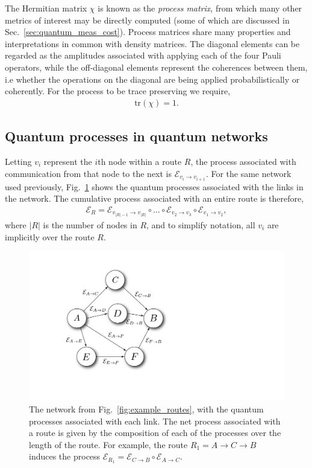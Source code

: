 \documentclass[aps,rmp,twocolumn,amsmath,amssymb,nofootinbib,superscriptaddress,longbibliography,floatfix]{revtex4-1}
\begin{document}
The Hermitian matrix $\chi$ is known as the \emph{process matrix}, from which many other metrics of interest may be directly computed (some of which are discussed in Sec.~\ref{sec:quantum_meas_cost}). Process matrices share many properties and interpretations in common with density matrices. The diagonal elements can be regarded as the amplitudes associated with applying each of the four Pauli operators, while the off-diagonal elements represent the coherences between them, i.e whether the operations on the diagonal are being applied probabilistically or coherently. For the process to be trace preserving we require,
\begin{align}
\mathrm{tr}(\chi) = 1.
\end{align}

%
%

\subsection{Quantum processes in quantum networks} \label{sec:quant_proc_in}

Letting $v_i$ represent the $i$th node within a route $R$, the process associated with communication from that node to the next is $\mathcal{E}_{v_i\to v_{i+1}}$. For the same network used previously, Fig.~\ref{fig:example_proc_graph} shows the quantum processes associated with the links in the network. The cumulative process associated with an entire route is therefore,
\begin{align}
\mathcal{E}_R = \mathcal{E}_{{v_{|R|-1}}\to v_{|R|}} \circ \dots \circ \mathcal{E}_{v_2\to v_3} \circ \mathcal{E}_{v_1\to v_2},
\end{align}
where $|R|$ is the number of nodes in $R$, and to simplify notation, all $v_i$ are implicitly over the route $R$.

\begin{figure}[!htb]
\includegraphics[width=0.6\columnwidth]{example_graph}
\caption{The network from Fig.~\ref{fig:example_routes}, with the quantum processes associated with each link. The net process associated with a route is given by the composition of each of the processes over the length of the route. For example, the route \mbox{$R_1=A\to C\to B$} induces the process \mbox{$\mathcal{E}_{R_1} = \mathcal{E}_{C\to B} \circ \mathcal{E}_{A\to C}$}.} \label{fig:example_proc_graph}
\end{figure}
\end{document}
